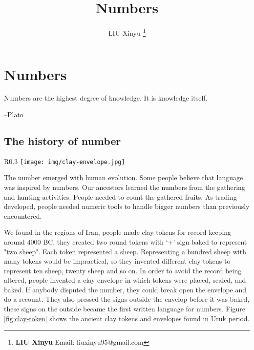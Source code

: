 \documentclass[UTF8]{article}
\begin{document}
\title{Numbers}

\author{LIU Xinyu
\thanks{{\bfseries LIU Xinyu} \newline
  Email: liuxinyu95@gmail.com \newline}
  }

\maketitle
\fi


\ifx\wholebook\relax
\chapter{Numbers}
\fi

\epigraph{Numbers are the highest degree of knowledge. It is knowledge itself.}{--Plato}

\section{The history of number}

\begin{wrapfigure}{R}{0.3\textwidth}
 \centering
 \texttt{[image: img/clay-envelope.jpg]}
 \caption{The envelop of tokens in Uruk period from Susa. Louvre Museum}
 \label{fig:clay-token}
\end{wrapfigure}

The number emerged with human evolution. Some people believe that language was inspired by numbers. Our ancestors learned the numbers from the gathering and hunting activities. People needed to count the gathered fruits. As trading developed, people needed numeric tools to handle bigger numbers than previously encountered.

We found in the regions of Iran, people made clay tokens for record keeping around 4000 BC. they created two round tokens with `+' sign baked to represent "two sheep". Each token represented a sheep. Representing a hundred sheep with many tokens would be impractical, so they invented different clay tokens to represent ten sheep, twenty sheep and so on. In order to avoid the record being altered, people invented a clay envelope in which tokens were placed, sealed, and baked. If anybody disputed the number, they could break open the envelope and do a recount. They also pressed the signs outside the envelop before it was baked, these signs on the outside became the first written language for numbers\cite{Calvin-Clawson-1994}. Figure \ref{fig:clay-token} shows the ancient clay tokens and envelopes found in Uruk period.
\end{document}
